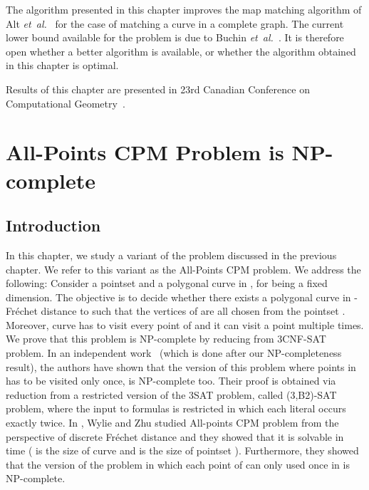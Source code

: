 \documentclass[12pt]{dalthesis}
\newcommand{\etal}{{\em et~al.\/}}
\newcommand{\Frechet}{Fr\'echet }
\begin{document}
The algorithm presented in this chapter improves
the map matching algorithm of Alt \etal~\cite{AltERW03a} 
for the case of matching a curve in a complete graph.
The current lower bound available for the problem is 
due to Buchin \etal~\cite{LowerBound-FD}.
It is therefore open whether a better algorithm is available,
or whether the algorithm obtained in this chapter is optimal.



Results of this chapter 
are presented in 23rd Canadian Conference on 
Computational Geometry~\cite{oursCCCG2011}.

































\chapter{All-Points CPM Problem is NP-complete}
\label{ch:NP-Complete}

\section{Introduction}
In this chapter, we study 
a variant of the problem discussed in the previous chapter. 
We refer to this variant as the All-Points CPM problem. We address the following:
Consider a pointset  and a polygonal curve  in , 
for  being a fixed dimension.
The objective is to decide whether there exists a polygonal curve  in  -\Frechet
distance to  such that the vertices of  are all chosen from the 
pointset . Moreover, curve  has to visit every point of 
and it can visit a point multiple times. 
We  prove  that  this problem  is  NP-complete  by  reducing from 3CNF-SAT problem.
In an independent work~\cite{NPComplete-Pointset} (which is done after   
our NP-completeness result), the authors have shown that
the version of this problem where points in  has to 
be visited only once, is NP-complete too. 
Their proof is obtained via reduction
from a restricted version of the 3SAT problem, 
called (3,B2)-SAT problem,
where the input to formulas is restricted
in which each literal occurs exactly twice.
In \cite{DiscretelyFollowing},  
Wylie and Zhu studied 
All-points CPM problem from the 
perspective of discrete \Frechet distance
and they showed that it is solvable in 
 time ( is the size of curve  and  is the size of  pointset ). 
Furthermore, they showed that the version of the problem in which 
each point of  can only used once in  is  NP-complete.
\end{document}
